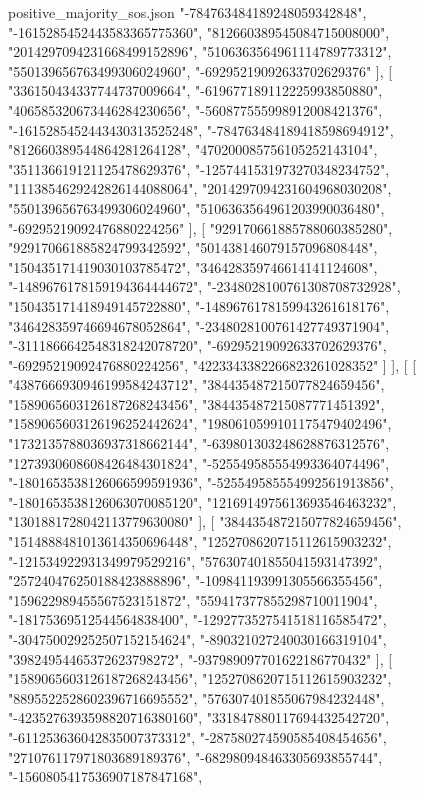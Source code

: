 \begin{filecontents*}[overwrite]{positive_majority_sos.json}
    "-784763484189248059342848",
    "-1615285452443583365775360",
    "812660389545084715008000",
    "2014297094231668499152896",
    "5106363564961114789773312",
    "550139656763499306024960",
    "-69295219092633702629376"
   ],
   [
    "336150434337744737009664",
    "-619677189112225993850880",
    "406585320673446284230656",
    "-560877555998912008421376",
    "-1615285452443430313525248",
    "-784763484189418598694912",
    "812660389544864281264128",
    "470200085756105252143104",
    "351136619121125478629376",
    "-1257441531973270348234752",
    "1113854629242826144088064",
    "2014297094231604968030208",
    "550139656763499306024960",
    "5106363564961203990036480",
    "-69295219092476880224256"
   ],
   [
    "929170661885788060385280",
    "929170661885824799342592",
    "501438146079157096808448",
    "150435171419030103785472",
    "346428359746614141124608",
    "-1489676178159194364444672",
    "-2348028100761308708732928",
    "150435171418949145722880",
    "-1489676178159943261618176",
    "346428359746694678052864",
    "-2348028100761427749371904",
    "-3111866642548318242078720",
    "-69295219092633702629376",
    "-69295219092476880224256",
    "4223343382266823261028352"
   ]
  ],
  [
   [
    "4387666930946199584243712",
    "384435487215077824659456",
    "1589065603126187268243456",
    "384435487215087771451392",
    "1589065603126196252442624",
    "1980610599101175479402496",
    "1732135788036937318662144",
    "-639801303248628876312576",
    "1273930608608426484301824",
    "-525549585554993364074496",
    "-1801653538126066599591936",
    "-525549585554992561913856",
    "-1801653538126063070085120",
    "1216914975613693546463232",
    "1301881728042113779630080"
   ],
   [
    "384435487215077824659456",
    "1514888481013614350696448",
    "1252708620715112615903232",
    "-121534922931349979529216",
    "576307401855041593147392",
    "257240476250188423888896",
    "-109841193991305566355456",
    "159622989455567523151872",
    "559417377855298710011904",
    "-18175369512544564838400",
    "-1292773527541518116585472",
    "-304750029252507152154624",
    "-890321027240030166319104",
    "39824954465372623798272",
    "-937989097701622186770432"
   ],
   [
    "1589065603126187268243456",
    "1252708620715112615903232",
    "8895522528602396716695552",
    "576307401855067984232448",
    "-4235276393598820716380160",
    "331847880117694432542720",
    "-611253636042835007373312",
    "-287580274590585408454656",
    "271076117971803689189376",
    "-682980948463305693855744",
    "-1560805417536907187847168",

\end{filecontents*}
